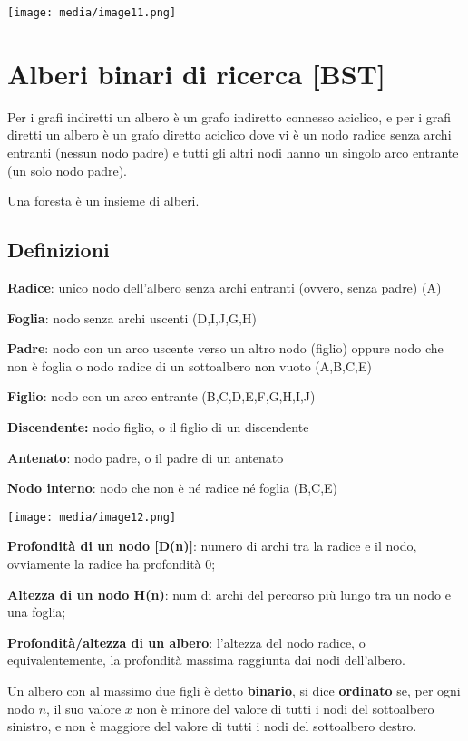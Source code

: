 \texttt{[image: media/image11.png]}

\section{Alberi binari di ricerca
{[}BST{]}}\label{alberi-binari-di-ricerca-bst}

Per i grafi indiretti un albero è un grafo indiretto connesso aciclico,
e per i grafi diretti un albero è un grafo diretto aciclico dove vi è un
nodo radice senza archi entranti (nessun nodo padre) e tutti gli altri
nodi hanno un singolo arco entrante (un solo nodo padre).

Una foresta è un insieme di alberi.

\subsection{Definizioni}\label{definizioni-1}

\textbf{Radice}: unico nodo dell'albero senza archi entranti (ovvero,
senza padre) (A)

\textbf{Foglia}: nodo senza archi uscenti (D,I,J,G,H)

\textbf{Padre}: nodo con un arco uscente verso un altro nodo (figlio)
oppure nodo che non è foglia o nodo radice di un sottoalbero non vuoto
(A,B,C,E)

\textbf{Figlio}: nodo con un arco entrante (B,C,D,E,F,G,H,I,J)

\textbf{Discendente:} nodo figlio, o il figlio di un discendente

\textbf{Antenato}: nodo padre, o il padre di un antenato

\textbf{Nodo interno}: nodo che non è né radice né foglia (B,C,E)

\texttt{[image: media/image12.png]}

\textbf{Profondità di un nodo {[}D(n){]}}: numero di archi tra la radice
e il nodo, ovviamente la radice ha profondità 0;

\textbf{Altezza di un nodo H(n)}: num di archi del percorso più lungo
tra un nodo e una foglia;

\textbf{Profondità/altezza di un albero}: l'altezza del nodo radice, o
equivalentemente, la profondità massima raggiunta dai nodi dell'albero.

Un albero con al massimo due figli è detto \textbf{binario}, si dice
\textbf{ordinato} se, per ogni nodo \(n\), il suo valore \(x\) non è
minore del valore di tutti i nodi del sottoalbero sinistro, e non è
maggiore del valore di tutti i nodi del sottoalbero destro.

